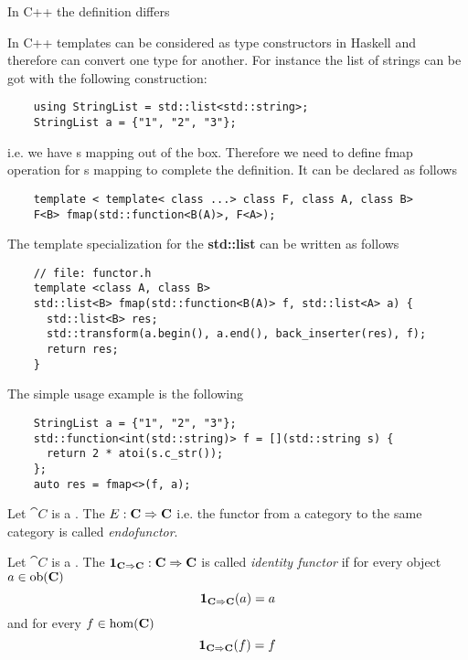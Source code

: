 In C++ the definition differs
\begin{example}[Functor][$\cat{C++}$]
  \label{ex:functor_cpp}
  In C++ templates can be considered as type constructors in Haskell
  and therefore can convert one type for another. For instance the
  list of strings can be got with the following construction:

  \begin{verbatim}
    using StringList = std::list<std::string>;
    StringList a = {"1", "2", "3"};
  \end{verbatim} 
  i.e. we have s mapping out of the box.
  Therefore we need to define fmap
  operation for s mapping to complete the
   definition. It can be declared as 
  follows 
  \begin{verbatim}
    template < template< class ...> class F, class A, class B> 
    F<B> fmap(std::function<B(A)>, F<A>);
  \end{verbatim}
  The template specialization for the \textbf{std::list} can be
  written as follows
  \begin{verbatim}
    // file: functor.h
    template <class A, class B>
    std::list<B> fmap(std::function<B(A)> f, std::list<A> a) {
      std::list<B> res;
      std::transform(a.begin(), a.end(), back_inserter(res), f);
      return res;
    }
  \end{verbatim} 

  The simple usage example is the following
  \begin{verbatim}
    StringList a = {"1", "2", "3"};
    std::function<int(std::string)> f = [](std::string s) {
      return 2 * atoi(s.c_str());
    };
    auto res = fmap<>(f, a);
  \end{verbatim}
\end{example}


\begin{definition}[Endofunctor]
  \label{def:endofunctor}
  Let $\cat{C}$ is a . The
   $E: \mathbf{C} \Rightarrow \mathbf{C}$ i.e. 
  the functor from a category to the same category is called
  \textit{endofunctor}. 
\end{definition}

\begin{definition}
  \label{def:idfunctor}
  Let $\cat{C}$ is a . The
   $\mathbf{1}_{ \mathbf{C} \Rightarrow \mathbf{C} }: \mathbf{C} \Rightarrow \mathbf{C}$ is called \textit{identity
    functor} if for every object $a \in \mathrm{ob}(\mathbf{C})$
  \[
  \mathbf{1}_{ \mathbf{C} \Rightarrow \mathbf{C} }(a) = a
  \]
  and for every  $f \in \mathrm{hom}(\mathbf{C})$
  \[
  \mathbf{1}_{ \mathbf{C} \Rightarrow \mathbf{C} }(f) = f
  \] 
\end{definition}

